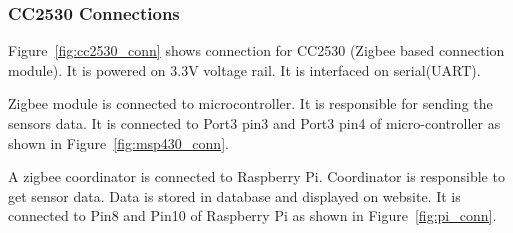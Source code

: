 \documentclass[a4paper,12pt]{article}
\begin{document}
\subsubsection{CC2530 Connections}
Figure~\ref{fig:cc2530_conn} shows connection for CC2530 (Zigbee based connection module). It is powered on 3.3V voltage rail. It is interfaced on serial(UART). 

Zigbee module is connected to microcontroller. It is responsible for sending the sensors data. It is connected to Port3 pin3 and Port3 pin4 of micro-controller as shown in Figure~\ref{fig:msp430_conn}. 

A zigbee coordinator is connected to Raspberry Pi. Coordinator is responsible to get sensor data. Data is stored in database and displayed on website. It is connected to Pin8 and Pin10 of Raspberry Pi as shown in Figure~\ref{fig:pi_conn}.
\end{document}
